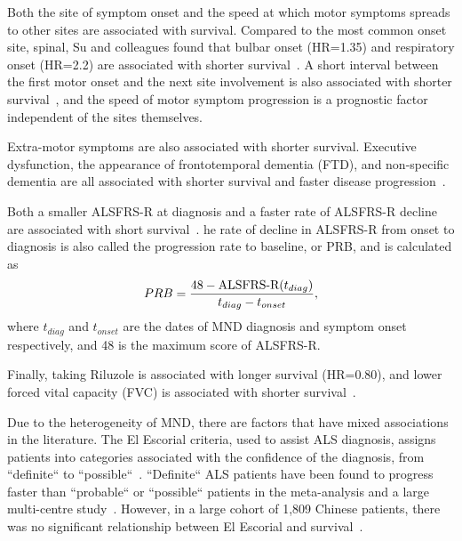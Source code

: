 Both the site of symptom onset and the speed at which motor symptoms spreads to other sites are associated with survival.
Compared to the most common onset site, spinal, Su and colleagues found that bulbar onset (HR=1.35) and respiratory onset (HR=2.2) are associated with shorter survival~\cite{suPredictorsSurvivalPatients2021}.
A short interval between the first motor onset and the next site involvement is also associated with shorter survival~\cite{fujimura-kiyonoOnsetSpreadingPatterns2011a}, and the speed of motor symptom progression is a prognostic factor independent of the sites themselves.

Extra-motor symptoms are also associated with shorter survival.
Executive dysfunction, the appearance of frontotemporal dementia (FTD), and non-specific dementia are all associated with shorter survival and faster disease progression~\cite{suPredictorsSurvivalPatients2021, elaminExecutiveDysfunctionNegative2011}.

Both a smaller ALSFRS-R at diagnosis and a faster rate of ALSFRS-R decline are associated with short survival~\cite{suPredictorsSurvivalPatients2021}.
he rate of decline in ALSFRS-R from onset to diagnosis is also called the progression rate to baseline, or PRB, and is calculated as
\begin{equation}
    PRB = \frac{48-\textnormal{ALSFRS-R}(t_{diag})}{t_{diag}-t_{onset}},
\end{equation}\label{eq:PRB}
where $t_{diag}$ and $t_{onset}$ are the dates of MND diagnosis and symptom onset respectively, and 48 is the maximum score of ALSFRS-R.

Finally, taking Riluzole is associated with longer survival (HR=0.80), and lower forced vital capacity (FVC) is associated with shorter survival~\cite{suPredictorsSurvivalPatients2021}.

\newline Due to the heterogeneity of MND, there are factors that have mixed associations in the literature.
The El Escorial criteria, used to assist ALS diagnosis, assigns patients into categories associated with the confidence of the diagnosis, from ``definite`` to ``possible``~\cite{ludolphRevisionEscorialCriteria2015}.
``Definite`` ALS patients have been found to progress faster than ``probable`` or ``possible`` patients in the meta-analysis and a large multi-centre study~\cite{suPredictorsSurvivalPatients2021, westenengPrognosisPatientsAmyotrophic2018}.
However, in a large cohort of 1,809 Chinese patients, there was no significant relationship between El Escorial and survival~\cite{gaoEpidemiologyFactorsPredicting2021}.

